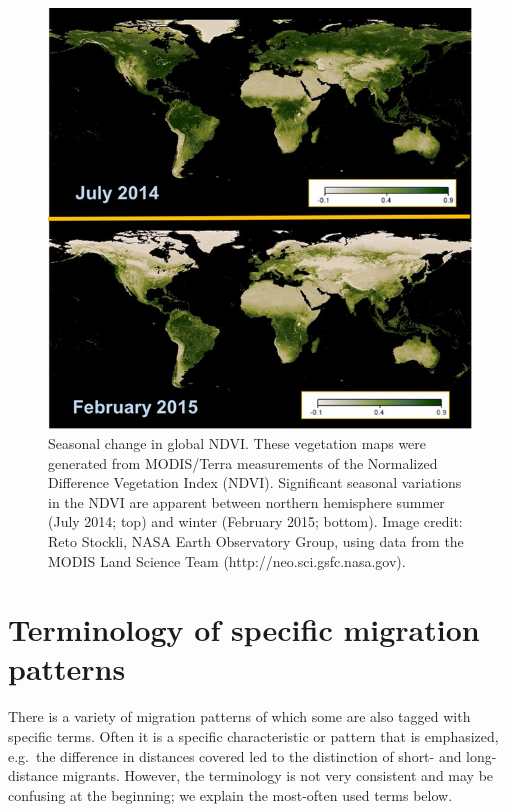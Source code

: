 \documentclass[
]{book}
\begin{document}
\begin{figure}

{\centering \includegraphics[width=1\linewidth]{figures/Fig_SeasonalChanges_NDVI} 

}

\caption{Seasonal change in global NDVI. These vegetation maps were generated from MODIS/Terra measurements of the Normalized Difference Vegetation Index (NDVI). Significant seasonal variations in the NDVI are apparent between northern hemisphere summer (July 2014; top) and winter (February 2015; bottom). Image credit: Reto Stockli, NASA Earth Observatory Group, using data from the MODIS Land Science Team (http://neo.sci.gsfc.nasa.gov).}\label{fig:unnamed-chunk-1}
\end{figure}

\hypertarget{terminology-of-specific-migration-patterns}{%
\section{Terminology of specific migration patterns}\label{terminology-of-specific-migration-patterns}}

There is a variety of migration patterns of which some are also tagged with specific terms. Often it is a specific characteristic or pattern that is emphasized, e.g.~the difference in distances covered led to the distinction of short- and long-distance migrants. However, the terminology is not very consistent and may be confusing at the beginning; we explain the most-often used terms below.
\end{document}
